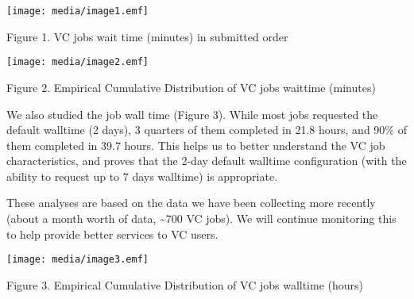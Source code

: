 \texttt{[image: media/image1.emf]}

Figure 1. VC jobs wait time (minutes) in submitted order

\texttt{[image: media/image2.emf]}

Figure 2. Empirical Cumulative Distribution of VC jobs waittime
(minutes)

We also studied the job wall time (Figure 3). While most jobs requested
the default walltime (2 days), 3 quarters of them completed in 21.8
hours, and 90\% of them completed in 39.7 hours. This helps us to better
understand the VC job characteristics, and proves that the 2-day default
walltime configuration (with the ability to request up to 7 days
walltime) is appropriate.

These analyses are based on the data we have been collecting more
recently (about a month worth of data, \textasciitilde{}700 VC jobs). We
will continue monitoring this to help provide better services to VC
users.

\texttt{[image: media/image3.emf]}

Figure 3. Empirical Cumulative Distribution of VC jobs walltime (hours)

